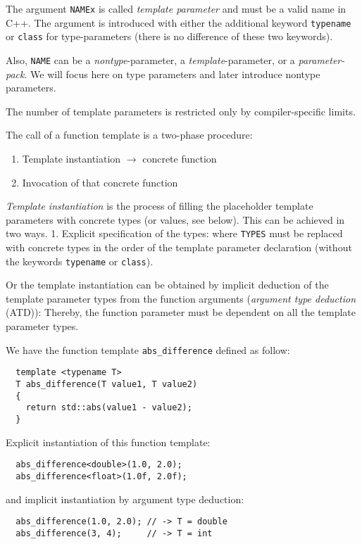 The argument \texttt{NAMEx} is called \emph{template parameter} and must be a valid name in C++. The argument is introduced with either the
additional keyword \texttt{typename} or \texttt{class} for type-parameters (there is no difference of these two keywords).

\begin{rem}
  Also, \texttt{NAME} can be a \emph{nontype}-parameter, a \emph{template}-parameter, or a \emph{parameter-pack}. We will focus here on type parameters and later introduce nontype parameters.
\end{rem}

\begin{rem}
  The number of template parameters is restricted only by compiler-specific limits.
\end{rem}

The call of a function template is a two-phase procedure:
\begin{enumerate}
  \item Template instantiation $\rightarrow$ concrete function
  \item Invocation of that concrete function
\end{enumerate}

\emph{Template instantiation} is the process of filling the placeholder template parameters with concrete types (or values, see below). This can be achieved
in two ways. 1. Explicit specification of the types:
%
%
where \texttt{TYPES} must be replaced with concrete types in the order of the template parameter declaration (without the keywords \texttt{typename} or
\texttt{class}).

Or the template instantiation can be obtained by implicit deduction of the template parameter types from the function arguments
(\emph{argument type deduction} (ATD)):
%
%
Thereby, the function parameter must be dependent on all the template parameter types.

\begin{example}
  We have the function template \texttt{abs\_difference} defined as follow:
  \begin{verbatim}
  template <typename T>
  T abs_difference(T value1, T value2)
  {
    return std::abs(value1 - value2);
  }
  \end{verbatim}
  Explicit instantiation of this function template:
  \begin{verbatim}
  abs_difference<double>(1.0, 2.0);
  abs_difference<float>(1.0f, 2.0f);
  \end{verbatim}
  and implicit instantiation by argument type deduction:
  \begin{verbatim}
  abs_difference(1.0, 2.0); // -> T = double
  abs_difference(3, 4);     // -> T = int
  \end{verbatim}
\end{example}

